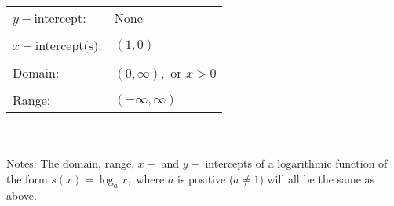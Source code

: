 \documentclass[12pt]{book}
\theoremstyle{definition}
\begin{document}
\vspace{0.5in}
\begin{tabular}{ll}
$y-$intercept: & None\\
&\\
$x-$intercept(s): & $(1,0)$\\
&\\
Domain: & $(0,\infty),$ or $x>0$\\
&\\
Range: & $(-\infty,\infty)$
\end{tabular}
\\
~\\

Notes: The domain, range, $x-$ and $y-$ intercepts of a logarithmic function of the form $s(x)=\log_ax,$ where $a$ is positive ($a\neq 1$) will all be the same as above. 
\end{document}
